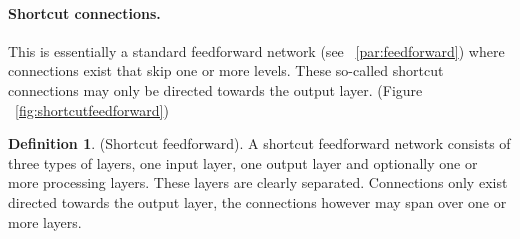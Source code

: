 \documentclass[pdftex,a4paper,12pt,twoside]{report}
\theoremstyle{plain} \newtheorem{theorem}{Theorem} \newtheorem{proposition}{Proposition} \newtheorem{lemma}{Lemma} \newtheorem*{corollary}{Corollary}
\theoremstyle{definition} \newtheorem{definition}{Definition} \newtheorem{conjecture}{Conjecture} \newtheorem*{example}{Example} \newtheorem{algorithm}{Algorithm}
\theoremstyle{remark} \newtheorem*{remark}{Remark} \newtheorem*{note}{Note} \newtheorem{case}{Case}
\begin{document}
\paragraph{Shortcut connections.}
This is essentially a standard feedforward network (see ~\ref{par:feedforward}) where connections exist that skip one or more levels. These so-called shortcut connections may only be directed towards the output layer. (Figure ~\ref{fig:shortcutfeedforward})
\begin{definition}
(Shortcut feedforward). A shortcut feedforward network consists of three types of layers, one input layer, one output layer and optionally one or more processing layers. These layers are clearly separated. Connections only exist directed towards the output layer, the connections however may span over one or more layers.
\end{definition}
\end{document}
